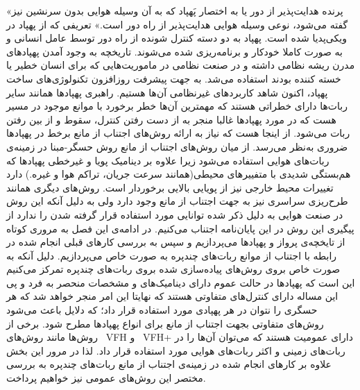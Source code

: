 «پرنده هدایت‌پذیر از دور یا به اختصار پَهپاد که به آن وسیله هوایی بدون سرنشین نیز گفته می‌شود، نوعی وسیله هوایی هدایت‌پذیر از راه دور است.» تعریفی که از پهپاد در ویکی‌پدیا شده است. پهپاد به دو دسته کنترل شونده از راه دور توسط عامل انسانی و به صورت کاملا خودکار و برنامه‌ریزی شده می‌شوند. تاریخچه به وجود آمدن پهپادهای مدرن ریشه نظامی داشته و در صنعت نظامی در ماموریت‌هایی که برای انسان خطیر یا خسته کننده بودند استفاده می‌شد. به جهت پیشرفت روزافزون تکنولوژی‌های ساخت پهپاد، اکنون شاهد کاربردهای غیرنظامی آن‌ها هستیم. راهبری پهپادها همانند سایر ربات‌ها دارای خطراتی هستند که مهمترین آن‌ها خطر برخورد با موانع موجود در مسیر هست که در مورد پهپادها غالبا منجر به از دست رفتن کنترل، سقوط و از بین رفتن ربات می‌شود. از اینجا هست که نیاز به ارائه روش‌های اجتناب از مانع برخط در پهپادها ضروری به‌نظر می‌رسد. از میان روش‌های اجتناب از مانع روش حسگر-مبنا در زمینه‌ی ربات‌های هوایی استفاده می‌شود زیرا علاوه بر دینامیک پویا و غیرخطی پهپادها که هم‌بستگی شدیدی با متفییرهای محیطی(همانند سرعت جریان، تراکم هوا و غیره.) دارد تغییرات محیط خارجی نیز از پویایی بالایی برخوردار است. روش‌های دیگری همانند طرح‌ریزی سراسری نیز به جهت اجتناب از مانع وجود دارد ولی به دلیل آنکه این روش در صنعت هوایی به دلیل ذکر شده توانایی مورد استفاده قرار گرفته شدن را ندارد از پیگیری این روش در این پایان‌نامه اجتناب می‌کنیم.
در ادامه‌ی این فصل به مروری کوتاه از تایخچه‌ی پرواز و پهپادها می‌پردازیم و سپس به بررسی کارهای قبلی انجام شده در رابطه با اجتناب از موانع ربات‌های چندپره به صورت خاص می‌پردازیم. دلیل آنکه به صورت خاص بروی روش‌های پیاده‌سازی شده بروی ربات‌های چندپره تمرکز می‌کنیم این است که پهپادها در حالت عموم دارای دینامیک‌های و مشخصات منحصر به فرد و پی این مساله دارای کنترل‌های متفاوتی هستند که نهایتا این امر منجر خواهد شد که هر حسگری را نتوان در هر پهپادی مورد استفاده قرار داد؛ که دلایل باعث می‌شود روش‌های متفاوتی بجهت اجتناب از مانع برای انواع پهپادها مطرح شود. برخی از روش‌ها مانند روش‌های \ {VFH} و \ {VFH+} دارای عمومیت هستند که می‌توان آن‌ها را در ربات‌های زمینی و اکثر ربات‌های هوایی مورد استفاده قرار داد. لذا در مرور این بخش علاوه بر کارهای انجام شده در زمینه‌ی اجتناب از مانع ربات‌های چندپره به بررسی مختصر این روش‌های عمومی نیز خواهیم پرداخت.

